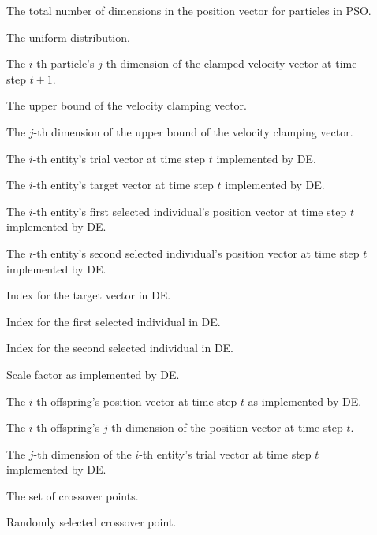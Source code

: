 \begin{description}
	\item [\parbox{2cm}{$J$}] The total number of dimensions in the position vector for particles in \acs{PSO}.
	\item [\parbox{2cm}{$U$}] The uniform distribution.
	\item [\parbox{2cm}{$v'_{ij}(t+1)$}] The $i$-th particle's $j$-th dimension of the clamped velocity vector at time step $t+1$.
	\item [\parbox{2cm}{$\boldsymbol{V}_{max}$}] The upper bound of the velocity clamping vector.
	\item [\parbox{2cm}{$V_{max,j}$}] The $j$-th dimension of the upper bound of the velocity clamping vector.
	\item [\parbox{2cm}{$\boldsymbol{u}_{i}(t)$}] The $i$-th entity's trial vector at time step $t$ implemented by \acs{DE}.
	\item [\parbox{2cm}{$\boldsymbol{x}_{i_{1}}(t)$}] The $i$-th entity's target vector at time step $t$ implemented by \acs{DE}.
	\item [\parbox{2cm}{$\boldsymbol{x}_{i_{2}}(t)$}] The $i$-th entity's first selected individual's position vector at time step $t$ implemented by \acs{DE}.
	\item [\parbox{2cm}{$\boldsymbol{x}_{i_{3}}(t)$}] The $i$-th entity's second selected individual's position vector at time step $t$ implemented by \acs{DE}.
	\item [\parbox{2cm}{$i_{1}$}] Index for the target vector in \acs{DE}.
	\item [\parbox{2cm}{$i_{2}$}] Index for the first selected individual in \acs{DE}.
	\item [\parbox{2cm}{$i_{3}$}] Index for the second selected individual in \acs{DE}.
	\item [\parbox{2cm}{$\beta$}] Scale factor as implemented by \acs{DE}.
	\item [\parbox{2cm}{$\boldsymbol{x}'_{i}(t)$}] The $i$-th offspring's position vector at time step $t$ as implemented by \acs{DE}.
	\item [\parbox{2cm}{$x'_{ij}(t)$}] The $i$-th offspring's $j$-th dimension of the position vector at time step $t$.
	\item [\parbox{2cm}{$u_{ij}(t)$}] The $j$-th dimension of the $i$-th entity's trial vector at time step $t$ implemented by \acs{DE}.
	\item [\parbox{2cm}{$\mathcal{J}$}] The set of crossover points.
	\item [\parbox{2cm}{$j^{*}$}] Randomly selected crossover point.

\end{description}

